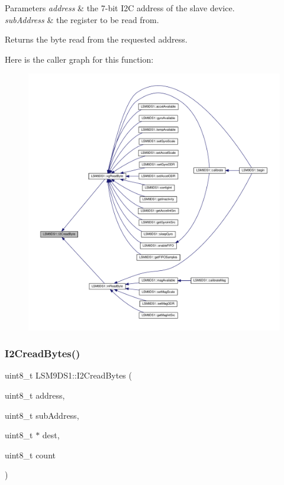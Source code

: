 \begin{DoxyParams}{Parameters}
{\em address} & the 7-\/bit I2C address of the slave device. \\
\hline
{\em sub\+Address} & the register to be read from. \\
\hline
\end{DoxyParams}
\begin{DoxyReturn}{Returns}
the byte read from the requested address. 
\end{DoxyReturn}
Here is the caller graph for this function\+:\nopagebreak
\begin{figure}[H]
\begin{center}
\leavevmode
\includegraphics[width=350pt]{classLSM9DS1_a7fc046d4b335494331905fdeb5c81c9e_icgraph}
\end{center}
\end{figure}
\mbox{\label{classLSM9DS1_adfc9a22290daddd7787e8023fa8f12cc}} 
\subsubsection{\texorpdfstring{I2\+Cread\+Bytes()}{I2CreadBytes()}}
{\footnotesize\ttfamily uint8\+\_\+t L\+S\+M9\+D\+S1\+::\+I2\+Cread\+Bytes (\begin{DoxyParamCaption}\item[{uint8\+\_\+t}]{address,  }\item[{uint8\+\_\+t}]{sub\+Address,  }\item[{uint8\+\_\+t $\ast$}]{dest,  }\item[{uint8\+\_\+t}]{count }\end{DoxyParamCaption})\hspace{0.3cm}{\ttfamily [protected]}}



